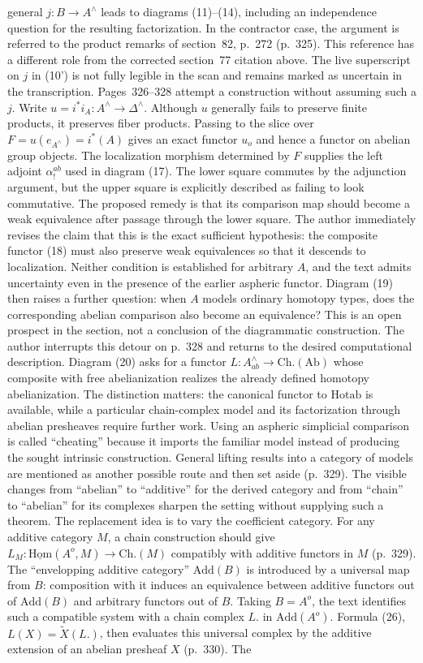 \documentclass[10pt,oneside]{book}
\begin{document}
general $j:B\to A^{\wedge}$ leads to diagrams (11)--(14), including an independence question for the resulting factorization. In the contractor case, the argument is referred to the product remarks of section~82, p.~272 (p.~325). This reference has a different role from the corrected section~77 citation above. The live superscript on $j$ in (10') is not fully legible in the scan and remains marked as uncertain in the transcription. Pages~326--328 attempt a construction without assuming such a $j$. Write $u=i^*i_A:A^{\wedge}\to\Delta^{\wedge}$. Although $u$ generally fails to preserve finite products, it preserves fiber products. Passing to the slice over $F=u(e_{A^{\wedge}})=i^*(A)$ gives an exact functor $u_o$ and hence a functor on abelian group objects. The localization morphism determined by $F$ supplies the left adjoint $\alpha^{ab}_!$ used in diagram (17). The lower square commutes by the adjunction argument, but the upper square is explicitly described as failing to look commutative. The proposed remedy is that its comparison map should become a weak equivalence after passage through the lower square. The author immediately revises the claim that this is the exact sufficient hypothesis: the composite functor (18) must also preserve weak equivalences so that it descends to localization. Neither condition is established for arbitrary $A$, and the text admits uncertainty even in the presence of the earlier aspheric functor. Diagram (19) then raises a further question: when $A$ models ordinary homotopy types, does the corresponding abelian comparison also become an equivalence? This is an open prospect in the section, not a conclusion of the diagrammatic construction. The author interrupts this detour on p.~328 and returns to the desired computational description. Diagram (20) asks for a functor $L:A^{\wedge}_{ab}\to\mathrm{Ch.}(\mathrm{Ab})$ whose composite with free abelianization realizes the already defined homotopy abelianization. The distinction matters: the canonical functor to $\mathrm{Hotab}$ is available, while a particular chain-complex model and its factorization through abelian presheaves require further work. Using an aspheric simplicial comparison is called ``cheating'' because it imports the familiar model instead of producing the sought intrinsic construction. General lifting results into a category of models are mentioned as another possible route and then set aside (p.~329). The visible changes from ``abelian'' to ``additive'' for the derived category and from ``chain'' to ``abelian'' for its complexes sharpen the setting without supplying such a theorem. The replacement idea is to vary the coefficient category. For any additive category $M$, a chain construction should give $L_M:\underline{\mathrm{Hom}}(A^o,M)\to\mathrm{Ch.}(M)$ compatibly with additive functors in $M$ (p.~329). The ``envelopping additive category'' $\mathrm{Add}(B)$ is introduced by a universal map from $B$: composition with it induces an equivalence between additive functors out of $\mathrm{Add}(B)$ and arbitrary functors out of $B$. Taking $B=A^o$, the text identifies such a compatible system with a chain complex $L.$ in $\mathrm{Add}(A^o)$. Formula (26), $L(X)=\widetilde X(L.)$, then evaluates this universal complex by the additive extension of an abelian presheaf $X$ (p.~330). The 
\end{document}
